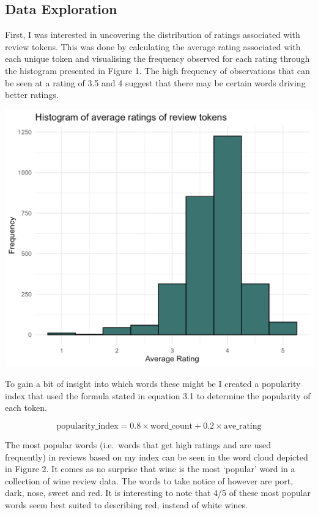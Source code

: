 \documentclass[11pt,preprint]{elsarticle}
\let\origfigure\figure
\let\endorigfigure\endfigure
\renewenvironment{figure}[1][2] {
    \expandafter\origfigure\expandafter[H]
} {
    \endorigfigure
}
\numberwithin{equation}{section}
\numberwithin{figure}{section}
\numberwithin{table}{section}
\begin{document}
\subsection{Data Exploration}\label{data-exploration}

First, I was interested in uncovering the distribution of ratings
associated with review tokens. This was done by calculating the average
rating associated with each unique token and visualising the frequency
observed for each rating through the histogram presented in Figure 1.
The high frequency of observations that can be seen at a rating of 3.5
and 4 suggest that there may be certain words driving better ratings.

\begin{figure}[H]

{\centering \includegraphics[width=0.8\linewidth]{writeup/fig1} 

}

\caption{Histogram of average ratings of review tokens}\label{fig:fig1}
\end{figure}

To gain a bit of insight into which words these might be I created a
popularity index that used the formula stated in equation 3.1 to
determine the popularity of each token.

\begin{equation}
    \text{popularity\_index} = 0.8 \times \text{word\_count} + 0.2 \times \text{ave\_rating}
\end{equation}

The most popular words (i.e.~words that get high ratings and are used
frequently) in reviews based on my index can be seen in the word cloud
depicted in Figure 2. It comes as no surprise that wine is the most
`popular' word in a collection of wine review data. The words to take
notice of however are port, dark, nose, sweet and red. It is interesting
to note that 4/5 of these most popular words seem best suited to
describing red, instead of white wines.
\end{document}
